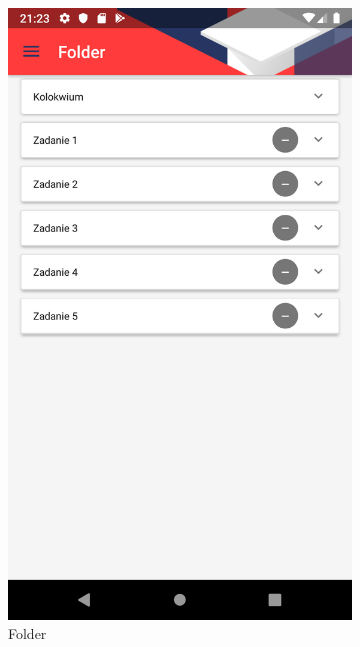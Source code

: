 \documentclass{pracamgr}
\begin{document}
\begin{figure}[p]
\begin{subfigure}[t]{0.3\textwidth}
		\includegraphics[width=\textwidth]{img/tests_folder.png}
		\caption{Folder}
		\label{fig:tests_folder}
	\end{subfigure}
	\quad
	\begin{subfigure}[t]{0.3\textwidth}

\end{subfigure}
\end{figure}
\end{document}
